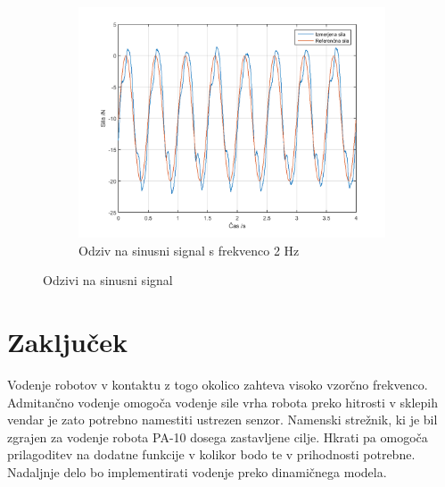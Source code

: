 \documentclass[a4paper]{article}
\begin{document}
\begin{figure}[!h]
	\begin{subfigure}[b]{0.5\textwidth}
		\includegraphics[width=\textwidth]{./slike/figure_20_hz}
		\caption{Odziv na sinusni signal s frekvenco 2 Hz}
	\end{subfigure}
	
	\caption{Odzivi na sinusni signal}
				
\end{figure}

\section{Zaključek}

Vodenje robotov v kontaktu z togo okolico zahteva visoko vzorčno frekvenco. Admitančno vodenje omogoča vodenje sile vrha robota preko hitrosti v sklepih vendar je zato potrebno namestiti ustrezen senzor. Namenski strežnik, ki je bil zgrajen za vodenje robota PA-10 dosega zastavljene cilje. Hkrati pa omogoča prilagoditev na dodatne funkcije v kolikor bodo te v prihodnosti potrebne. Nadaljnje delo bo implementirati vodenje preko dinamičnega modela. 

\small



%
%
%
%
\end{document}

